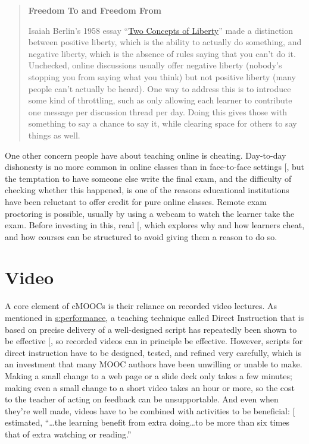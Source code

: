 \begin{quote}\setlength{\parindent}{0pt}
\textbf{Freedom To and Freedom From}

Isaiah Berlin's 1958 essay ``\href{https://en.wikipedia.org/wiki/Two_Concepts_of_Liberty}{Two Concepts of
Liberty}'' made a distinction between positive
liberty, which is the ability to actually do something, and negative
liberty, which is the absence of rules saying that you can't do
it. Unchecked, online discussions usually offer negative liberty
(nobody's stopping you from saying what you think) but not positive
liberty (many people can't actually be heard). One way to address
this is to introduce some kind of throttling, such as only allowing
each learner to contribute one message per discussion thread per
day. Doing this gives those with something to say a chance to say
it, while clearing space for others to say things as well.
\end{quote}

One other concern people have about teaching online is cheating.
Day-to-day dishonesty is no more common in online classes than in
face-to-face settings {[}\protect[\hyperlink{b:Beck2014}{Beck2014}]{]}, but the temptation to have
someone else write the final exam, and the difficulty of checking
whether this happened, is one of the reasons educational institutions
have been reluctant to offer credit for pure online classes. Remote exam
proctoring is possible, usually by using a webcam to watch the learner
take the exam. Before investing in this, read {[}\protect[\hyperlink{b:Lang2013}{Lang2013}]{]}, which
explores why and how learners cheat, and how courses can be structured
to avoid giving them a reason to do so.

\section{Video}\label{s:online-video}

A core element of cMOOCs is their reliance on recorded video lectures.
As mentioned in \protect\hyperlink{CHAPTER}{s:performance}, a teaching technique called
Direct Instruction that is based on precise delivery of a well-designed
script has repeatedly been shown to be effective {[}\protect[\hyperlink{b:Stoc2018}{Stoc2018}]{]}, so
recorded videos can in principle be effective. However, scripts for
direct instruction have to be designed, tested, and refined very
carefully, which is an investment that many MOOC authors have been
unwilling or unable to make. Making a small change to a web page or a
slide deck only takes a few minutes; making even a small change to a
short video takes an hour or more, so the cost to the teacher of acting
on feedback can be unsupportable. And even when they're well made,
videos have to be combined with activities to be beneficial:
{[}\protect[\hyperlink{b:Koed2015}{Koed2015}]{]} estimated, ``\ldots{}the learning benefit from
extra doing\ldots{}to be more than six times that of extra
watching or reading.''

